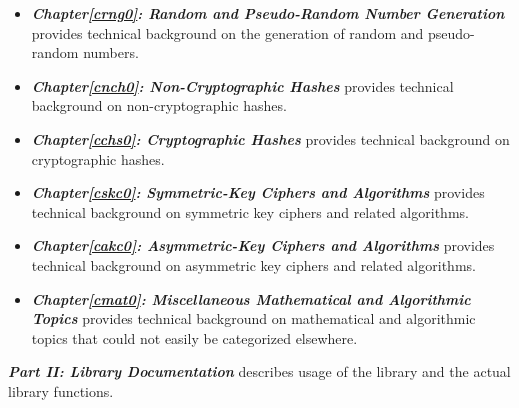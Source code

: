\begin{itemize}
\item \emph{\textbf{Chapter\postchapterwordnonstretchable{}\ref{crng0}: 
      Random and Pseudo-Random Number Generation}} provides technical background 
      on the generation of random and pseudo-random numbers.  
\item \emph{\textbf{Chapter\postchapterwordnonstretchable{}\ref{cnch0}: 
      Non-Cryptographic Hashes}} provides technical background on 
      non-cryptographic hashes.  
\item \emph{\textbf{Chapter\postchapterwordnonstretchable{}\ref{cchs0}: 
      Cryptographic Hashes}} provides technical background on cryptographic 
      hashes.  
\item \emph{\textbf{Chapter\postchapterwordnonstretchable{}\ref{cskc0}: 
      Symmetric-Key Ciphers and Algorithms}} provides technical background on 
      symmetric key ciphers and related algorithms.  
\item \emph{\textbf{Chapter\postchapterwordnonstretchable{}\ref{cakc0}: 
      Asymmetric-Key Ciphers and Algorithms}} provides technical background on 
      asymmetric key ciphers and related algorithms.  
\item \emph{\textbf{Chapter\postchapterwordnonstretchable{}\ref{cmat0}: 
      Miscellaneous Mathematical and Algorithmic Topics}} provides technical 
      background on mathematical and algorithmic topics that could not easily be 
      categorized elsewhere.  
\end{itemize}

\emph{\textbf{Part II: Library Documentation}} describes
usage of the library and the actual library functions.

